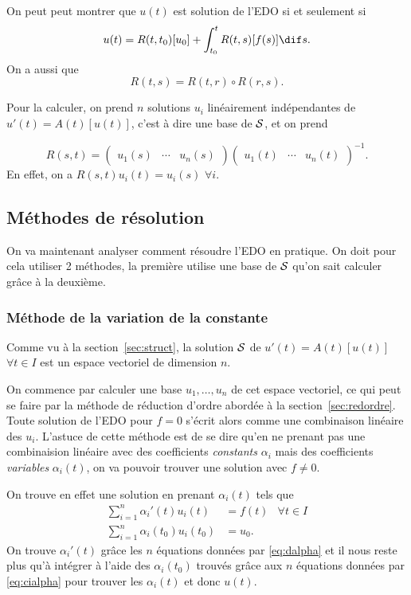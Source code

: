 On peut peut montrer que $u(t)$ est solution de l'EDO si et seulement si
\[ u(t) = R(t, t_0)[u_0] + \int_{t_0}^t R(t,s)[f(s)] \dif s. \]
On a aussi que
\[ R(t, s) = R(t, r) \circ R(r, s). \]

Pour la calculer, on prend $n$ solutions $u_i$ linéairement indépendantes
de $u'(t) = A(t)[u(t)]$, c'est à dire une base de $\mathcal{S}$, et on prend

\[ R(s, t) =
  \begin{pmatrix}
    u_1(s) & \cdots & u_n(s)
  \end{pmatrix}
  \begin{pmatrix}
    u_1(t) & \cdots & u_n(t)
\end{pmatrix}^{-1}. \]
En effet, on a $R(s, t) u_i(t) = u_i(s)$ $\forall i$.

\subsection{Méthodes de résolution}
On va maintenant analyser comment résoudre l'EDO en pratique.
On doit pour cela utiliser 2 méthodes,
la première utilise une base de $\mathcal{S}$ qu'on sait calculer grâce à la deuxième.

\subsubsection{Méthode de la variation de la constante}
Comme vu à la section~\ref{sec:struct},
la solution $\mathcal{S}$ de
$u'(t) = A(t)[u(t)]$ $\forall t \in I$
est un espace vectoriel de dimension $n$.

On commence par calculer une base $u_1,\ldots,u_n$ de cet espace vectoriel,
ce qui peut se faire par la méthode de réduction d'ordre abordée
à la section~\ref{sec:redordre}.
Toute solution de l'EDO pour $f = 0$ s'écrit alors comme une combinaison
linéaire des $u_i$.
L'astuce de cette méthode est de se dire qu'en ne prenant pas une combinaision
linéaire avec des coefficients \emph{constants} $\alpha_i$ mais des coefficients
\emph{variables} $\alpha_i(t)$,
on va pouvoir trouver une solution avec $f \neq 0$.

On trouve en effet une solution en prenant $\alpha_i(t)$ tels que
\begin{align}
  \label{eq:dalpha}
  \sum_{i=1}^n \alpha_i'(t)u_i(t) & = f(t) & \forall t \in I\\
  \label{eq:cialpha}
  \sum_{i=1}^n \alpha_i(t_0)u_i(t_0) & = u_0.
\end{align}
On trouve $\alpha_i'(t)$ grâce les
$n$ équations données par \eqref{eq:dalpha}
et il nous reste plus qu'à intégrer à l'aide des
$\alpha_i(t_0)$ trouvés grâce aux
$n$ équations données par \eqref{eq:cialpha}
pour trouver les $\alpha_i(t)$
et donc $u(t)$.

